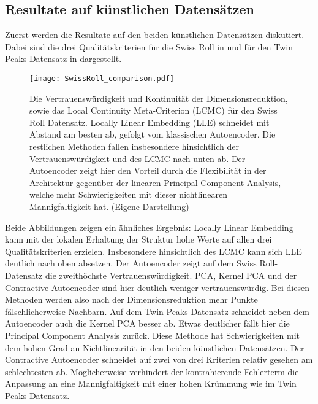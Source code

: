 \subsection{Resultate auf künstlichen Datensätzen}
\label{ch:Vergleich:sec:Resultate:kuenstlich}

Zuerst werden die Resultate auf den beiden künstlichen Datensätzen diskutiert. Dabei sind die drei
Qualitätskriterien für die Swiss Roll in  und für den Twin
Peaks-Datensatz in  dargestellt.
\begin{figure}[ht]
	\begin{center}
		\texttt{[image: SwissRoll\_comparison.pdf]}
	\end{center}
	\caption[Qualitätskriterien für den Swiss Roll-Datensatz]{Die Vertrauenswürdigkeit und Kontinuität der Dimensionsreduktion, sowie das Local Continuity Meta-Criterion (LCMC) für den Swiss Roll Datensatz. Locally Linear Embedding (LLE) schneidet mit Abstand am besten ab, gefolgt vom klassischen Autoencoder. Die restlichen Methoden fallen insbesondere hinsichtlich der Vertrauenswürdigkeit und des LCMC nach unten ab. Der Autoencoder zeigt hier den Vorteil durch die Flexibilität in der Architektur gegenüber der linearen Principal Component Analysis, welche mehr Schwierigkeiten mit dieser nichtlinearen Mannigfaltigkeit hat. (Eigene Darstellung)}
	\label{fig:SwissRollMetrics}
\end{figure}
Beide Abbildungen zeigen ein ähnliches Ergebnis: Locally Linear Embedding kann mit der lokalen Erhaltung der Struktur hohe Werte auf allen drei Qualitätskriterien erzielen. Insbesondere hinsichtlich des LCMC kann sich LLE deutlich nach oben absetzen.
Der Autoencoder zeigt auf dem Swiss Roll-Datensatz die zweithöchste Vertrauenswürdigkeit. PCA, Kernel PCA und der Contractive Autoencoder sind hier deutlich weniger vertrauenswürdig. Bei diesen Methoden werden also nach der Dimensionsreduktion mehr Punkte fälschlicherweise Nachbarn. Auf dem Twin Peaks-Datensatz schneidet neben dem Autoencoder auch die Kernel PCA besser ab. Etwas deutlicher fällt hier die Principal Component Analysis zurück. Diese Methode hat Schwierigkeiten mit dem hohen Grad an Nichtlinearität in den beiden künstlichen Datensätzen. Der Contractive Autoencoder schneidet auf zwei von drei Kriterien relativ gesehen am schlechtesten ab. Möglicherweise verhindert der kontrahierende Fehlerterm die Anpassung an eine Mannigfaltigkeit mit einer hohen Krümmung wie im Twin Peaks-Datensatz.

